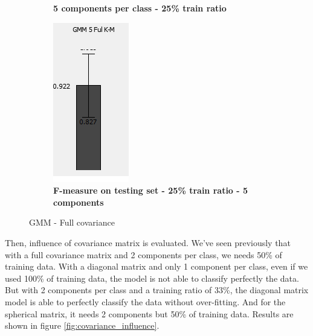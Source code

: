 \begin{figure} [ht]
\begin{subfigure}[h]{0.20\textwidth}
	\caption{\bf 5 components per class - 25\% train ratio}
    \end{subfigure}
    \hfill
    \begin{subfigure}[h]{0.20\textwidth}
    \centering
    \includegraphics[height=0.08\textheight]{./classification/overfitting_case_gmm_5_25_.png}
	\caption{\bf F-measure on testing set - 25\% train ratio - 5 components}
    \label{overfitting_case_5components}
    \end{subfigure}

\caption{GMM - Full covariance}
\label{fig:number_per_component}
\end{figure}

Then, influence of covariance matrix is evaluated. We've seen previously that with a full covariance matrix and 2 components per class, we needs 50\% of training data. With a diagonal matrix and only 1 component per class, even if we used 100\% of training data, the model is not able to classify perfectly the data. But with 2 components per class and a training ratio of 33\%, the diagonal matrix model is able to perfectly classify the data without over-fitting. And for the spherical matrix, it needs 2 components but 50\% of training data. Results are shown in figure \ref{fig:covariance_influence}.


